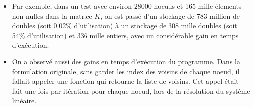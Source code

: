 \begin{itemize}
	\item Par exemple, dans un test avec environ \(28000\) noeuds et 165 mille élements non nulles dans la matrice \(K\), on est passé d'un stockage de 783 million de doubles (soit 0.02\% d'utilisation) à un stockage de 308 mille doubles (soit 54\% d'utilisation) et 336 mille entiers, avec un considérable gain en temps d'exécution.
	\item On a observé aussi des gains en temps d'exécution du programme. Dans la formulation originale, sans garder les index des voisins de chaque noeud, il fallait appeler une fonction qui retourne la liste de voisins. Cet appel était fait une fois par itération pour chaque noeud, lors de la résolution du système linéaire.
\end{itemize}